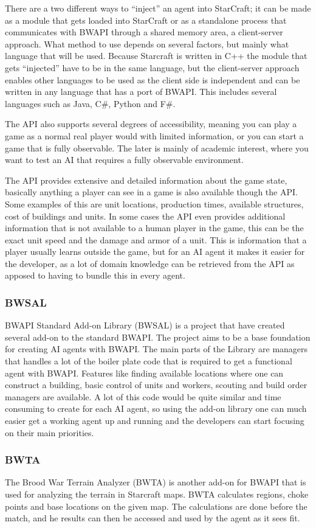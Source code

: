 There are a two different ways to ``inject'' an agent into StarCraft; it can be made as a module that gets loaded into StarCraft or as a standalone process that communicates with BWAPI through a shared memory area, a client-server approach. What method to use depends on several factors, but mainly what language that will be used. Because Starcraft is written in C++ the module that gets ``injected'' have to be in the same language, but the client-server approach enables other languages to be used as the client side is independent and can be written in any language that has a port of BWAPI. This includes several languages such as Java, C\#, Python and F\#.

The API also supports several degrees of accessibility, meaning you can play a
game as a normal real player would with limited information, or you can start a
game that is fully observable. The later is mainly of academic interest, where
you want to test an AI that requires a fully observable environment.

The API provides extensive and detailed information about the game state, basically anything a player can see in a game is also available though the API. Some examples of this are unit locations, production times, available structures, cost of buildings and units. In some cases the API even provides additional information that is not available to a human player in the game, this can be the exact unit speed and the damage and armor of a unit. This is information that a player usually learns outside the game, but for an AI agent it makes it easier for the developer, as a lot of domain knowledge can be retrieved from the API as apposed to having to bundle this in every agent. 

\subsubsection{BWSAL}
BWAPI Standard Add-on Library (BWSAL)\cite{bwsal} is a project that have created several add-on to the standard BWAPI. The project aims to be a base foundation for creating AI agents with BWAPI. The main parts of the Library are managers that handles a lot of the boiler plate code that is required to get a functional agent with BWAPI. Features like finding available locations where one can construct a building, basic control of units and workers, scouting and build order managers are available. A lot of this code would be quite similar and time consuming to create for each AI agent, so using the add-on library one can much easier get a working agent up and running and the developers can start focusing on their main priorities. 

\subsubsection{BWTA}
The Brood War Terrain Analyzer (BWTA)\cite{bwta} is another add-on for BWAPI that is used for analyzing the terrain in Starcraft maps. BWTA calculates regions, choke points and base locations on the given map. The calculations are done before the match, and he results can then be accessed and used by the agent as it sees fit.  